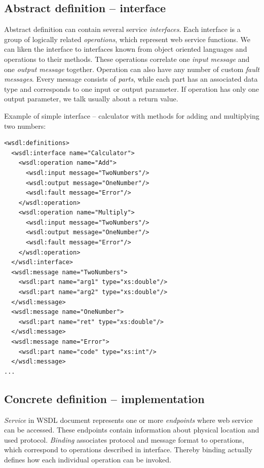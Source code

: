 \documentclass[12pt,notitlepage]{report}
\begin{document}
\subsection{Abstract definition -- interface}

Abstract definition can contain several service \textit{interfaces}. Each interface is a group of logically related \textit{operations}, which represent web service functions. We can liken the interface to interfaces known from object oriented languages and operations to their methods. These operations correlate one \textit{input message} and one \textit{output message} together. Operation can also have any number of custom \textit{fault messages}. Every message consists of \textit{parts}, while each part has an associated data type and corresponds to one input or output parameter. If operation has only one output parameter, we talk usually about a return value.

Example of simple interface -- calculator with methods for adding and multiplying two numbers:
\begin{small}
\begin{verbatim}
<wsdl:definitions>
  <wsdl:interface name="Calculator">
    <wsdl:operation name="Add">
      <wsdl:input message="TwoNumbers"/>
      <wsdl:output message="OneNumber"/>
      <wsdl:fault message="Error"/>
    </wsdl:operation>
    <wsdl:operation name="Multiply">
      <wsdl:input message="TwoNumbers"/>
      <wsdl:output message="OneNumber"/>
      <wsdl:fault message="Error"/>
    </wsdl:operation>
  </wsdl:interface>
  <wsdl:message name="TwoNumbers">
    <wsdl:part name="arg1" type="xs:double"/>
    <wsdl:part name="arg2" type="xs:double"/>
  </wsdl:message>
  <wsdl:message name="OneNumber">
    <wsdl:part name="ret" type="xs:double"/>
  </wsdl:message>
  <wsdl:message name="Error">
    <wsdl:part name="code" type="xs:int"/>
  </wsdl:message>
...
\end{verbatim}
\end{small}

\subsection{Concrete definition -- implementation}

\textit{Service} in WSDL document represents one or more \textit{endpoints} where web service can be accessed. These endpoints contain information about physical location and used protocol. \textit{Binding} associates protocol and message format to operations, which correspond to operations described in interface. Thereby binding actually defines how each individual operation can be invoked.
\end{document}
